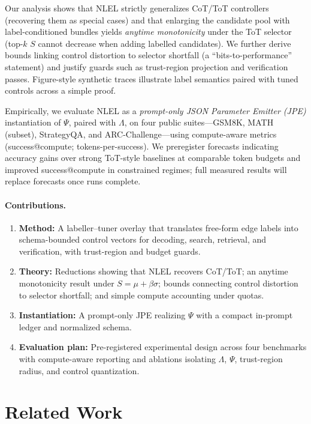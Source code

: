 \documentclass{article}
\theoremstyle{plain}
\theoremstyle{definition}
\theoremstyle{remark}
\begin{document}
Our analysis shows that NLEL strictly generalizes CoT/ToT controllers (recovering them as special cases) and that enlarging the candidate pool with label-conditioned bundles yields \emph{anytime monotonicity} under the ToT selector (top-\(k\) \(S\) cannot decrease when adding labelled candidates). We further derive bounds linking control distortion to selector shortfall (a ``bits-to-performance'' statement) and justify guards such as trust-region projection and verification passes. Figure-style synthetic traces illustrate label semantics paired with tuned controls across a simple proof.

Empirically, we evaluate NLEL as a \emph{prompt-only JSON Parameter Emitter (JPE)} instantiation of \(\Psi\), paired with \(\Lambda\), on four public suites---GSM8K, MATH (subset), StrategyQA, and ARC-Challenge---using compute-aware metrics (success@compute; tokens-per-success). We preregister forecasts indicating accuracy gains over strong ToT-style baselines at comparable token budgets and improved success@compute in constrained regimes; full measured results will replace forecasts once runs complete.

\paragraph{Contributions.}
\begin{enumerate}
\item \textbf{Method:} A labeller--tuner overlay that translates free-form edge labels into schema-bounded control vectors for decoding, search, retrieval, and verification, with trust-region and budget guards.
\item \textbf{Theory:} Reductions showing that NLEL recovers CoT/ToT; an anytime monotonicity result under \(S=\mu+\beta\sigma\); bounds connecting control distortion to selector shortfall; and simple compute accounting under quotas.
\item \textbf{Instantiation:} A prompt-only JPE realizing \(\Psi\) with a compact in-prompt ledger and normalized schema.
\item \textbf{Evaluation plan:} Pre-registered experimental design across four benchmarks with compute-aware reporting and ablations isolating \(\Lambda\), \(\Psi\), trust-region radius, and control quantization.
\end{enumerate}

\section{Related Work}
\end{document}

